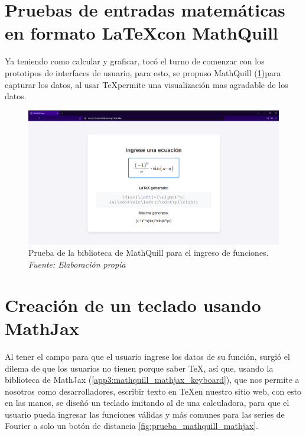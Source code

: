 \section{Pruebas de entradas matemáticas en formato \LaTeX con MathQuill}
Ya teniendo como calcular y graficar, tocó el turno de comenzar con los prototipos de interfaces de usuario, para esto, se propuso MathQuill (\ref{fig:prueba_mathquill})para capturar los datos, al usar \TeX permite una visualización mas agradable de los datos.

\begin{figure}[H]
	\centering
	\includegraphics[width=1\textwidth]{img/chapter06/prueba_mathquill.png}
	\caption[Prueba de la biblioteca de MathQuill para el ingreso de funciones.]{Prueba de la biblioteca de MathQuill para el ingreso de funciones. \textit{Fuente: Elaboración propia}}
	\label{fig:prueba_mathquill}
\end{figure}


\section{Creación de un teclado usando MathJax}
Al tener el campo para que el usuario ingrese los datos de su función, surgió el dilema de que los usuarios no tienen porque saber \TeX, así que, usando la biblioteca de MathJax (\ref{app3:mathquill_mathjax_keyboard}), que nos permite a nosotros como desarrolladores, escribir texto en \TeX en nuestro sitio web, con esto en las manos, se diseñó un teclado imitando al de una calculadora, para que el usuario pueda ingresar las funciones válidas y más comunes para las series de Fourier a solo un botón de distancia \ref{fig:prueba_mathquill_mathjax}.

